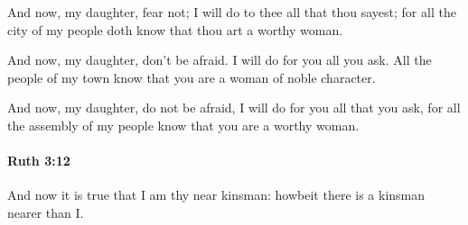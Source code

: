 			\begin{versebox}
					\item[BHS] 
					\item[LXX] 
					\item[ASV] And now, my daughter, fear not; I will do to thee all that thou sayest; for all the city of my people doth know that thou art a worthy woman.
					\item[NIV] And now, my daughter, don’t be afraid. I will do for you all you ask. All the people of my town know that you are a woman of noble character.
					\item[NRSV] And now, my daughter, do not be afraid, I will do for you all that you ask, for all the assembly of my people know that you are a worthy woman.
			\end{versebox}

		\paragraph{Ruth 3:12} %
			\label{RUTH-3-12}

			And now it is true that I am thy near kinsman: howbeit there is a kinsman nearer than I.

